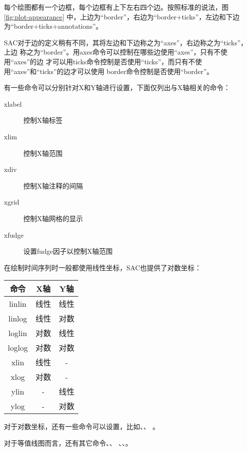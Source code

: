 每个绘图都有一个边框，每个边框有上下左右四个边。按照标准的说法，图\ref{fig:plot-appearance}
中，上边为``border''，右边为``border+ticks''，左边和下边为``border+ticks+annotations''。

SAC对于边的定义稍有不同，其将左边和下边称之为``axes''，右边称之为``ticks''，上边
称之为``border''。用axes命令可以控制在哪些边使用``axes''，只有不使用``axes''的边
才可以用ticks命令控制是否使用``ticks''，而只有不使用``axes''和``ticks''的边才可以使用
border命令控制是否使用``border''。

有一些命令可以分别针对X和Y轴进行设置，下面仅列出与X轴相关的命令：
\begin{description}
\item [xlabel] 控制X轴标签
\item [xlim] 控制X轴范围
\item [xdiv] 控制X轴注释的间隔
\item [xgrid] 控制X轴网格的显示
\item [xfudge] 设置fudge因子以控制X轴范围
\end{description}

在绘制时间序列时一般都使用线性坐标，SAC也提供了对数坐标：
\begin{table}
\flushleft
\scriptsize
\begin{tabular}{ccc}
    \toprule
    命令    &   X轴     &   Y轴     \\
    \midrule
    linlin  &   线性    &   线性    \\
    linlog  &   线性    &   对数    \\
    loglin  &   对数    &   线性    \\
    loglog  &   对数    &   对数    \\
    xlin    &   线性    &   -       \\
    xlog    &   对数    &   -       \\
    ylin    &   -       &   线性     \\
    ylog    &   -       &   对数    \\
    \bottomrule
\end{tabular}
\end{table}

对于对数坐标，还有一些命令可以设置，比如、、
。

对于等值线图而言，还有其它命令、、
、、。
